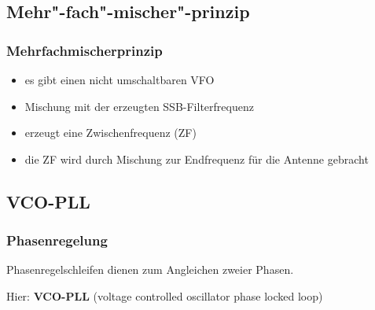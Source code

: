 \subsection{Mehr"-fach"-mischer"-prinzip}
\begin{frame}
  \frametitle{Mehrfachmischerprinzip}
  \begin{itemize}
    \item es gibt einen nicht umschaltbaren VFO
    \item Mischung mit der erzeugten SSB-Filterfrequenz
    \item erzeugt eine Zwischenfrequenz (ZF)
    \item die ZF wird durch Mischung zur Endfrequenz für die Antenne gebracht
  \end{itemize}
\end{frame}

\subsection{VCO-PLL}

\begin{frame}
  \frametitle{Phasenregelung}

  Phasenregelschleifen dienen zum Angleichen zweier Phasen.

  \bigskip

  Hier: \textbf{VCO-PLL} (voltage controlled oscillator phase locked loop)

\end{frame}

